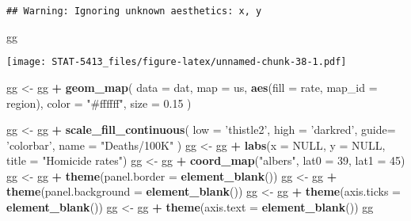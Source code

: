 \documentclass[]{book}
\newenvironment{Shaded}{\begin{snugshade}}{\end{snugshade}}
\newcommand{\DataTypeTok}[1]{\textcolor[rgb]{0.13,0.29,0.53}{#1}}
\newcommand{\DecValTok}[1]{\textcolor[rgb]{0.00,0.00,0.81}{#1}}
\newcommand{\FloatTok}[1]{\textcolor[rgb]{0.00,0.00,0.81}{#1}}
\newcommand{\KeywordTok}[1]{\textcolor[rgb]{0.13,0.29,0.53}{\textbf{#1}}}
\newcommand{\NormalTok}[1]{#1}
\newcommand{\OperatorTok}[1]{\textcolor[rgb]{0.81,0.36,0.00}{\textbf{#1}}}
\newcommand{\OtherTok}[1]{\textcolor[rgb]{0.56,0.35,0.01}{#1}}
\newcommand{\StringTok}[1]{\textcolor[rgb]{0.31,0.60,0.02}{#1}}
\begin{document}
\begin{verbatim}
## Warning: Ignoring unknown aesthetics: x, y
\end{verbatim}

\begin{Shaded}
\begin{Highlighting}[]
\NormalTok{gg}
\end{Highlighting}
\end{Shaded}

\texttt{[image: STAT-5413\_files/figure-latex/unnamed-chunk-38-1.pdf]}

\begin{Shaded}
\begin{Highlighting}[]
\NormalTok{gg <-}\StringTok{ }\NormalTok{gg }\OperatorTok{+}\StringTok{ }\KeywordTok{geom_map}\NormalTok{(}
    \DataTypeTok{data =}\NormalTok{ dat, }
    \DataTypeTok{map =}\NormalTok{ us,}
    \KeywordTok{aes}\NormalTok{(}\DataTypeTok{fill =}\NormalTok{ rate, }\DataTypeTok{map_id =}\NormalTok{ region),}
    \DataTypeTok{color =} \StringTok{"#ffffff"}\NormalTok{, }\DataTypeTok{size =} \FloatTok{0.15}
\NormalTok{)}

\NormalTok{gg <-}\StringTok{ }\NormalTok{gg }\OperatorTok{+}\StringTok{ }\KeywordTok{scale_fill_continuous}\NormalTok{(}
    \DataTypeTok{low  =} \StringTok{'thistle2'}\NormalTok{, }
    \DataTypeTok{high =} \StringTok{'darkred'}\NormalTok{, }
    \DataTypeTok{guide=} \StringTok{'colorbar'}\NormalTok{,}
    \DataTypeTok{name =} \StringTok{"Deaths/100K"}
\NormalTok{)}
\NormalTok{gg <-}\StringTok{ }\NormalTok{gg }\OperatorTok{+}\StringTok{ }\KeywordTok{labs}\NormalTok{(}\DataTypeTok{x =} \OtherTok{NULL}\NormalTok{, }\DataTypeTok{y =} \OtherTok{NULL}\NormalTok{, }\DataTypeTok{title =} \StringTok{"Homicide rates"}\NormalTok{)}
\NormalTok{gg <-}\StringTok{ }\NormalTok{gg }\OperatorTok{+}\StringTok{ }\KeywordTok{coord_map}\NormalTok{(}\StringTok{"albers"}\NormalTok{, }\DataTypeTok{lat0 =} \DecValTok{39}\NormalTok{, }\DataTypeTok{lat1 =} \DecValTok{45}\NormalTok{) }
\NormalTok{gg <-}\StringTok{ }\NormalTok{gg }\OperatorTok{+}\StringTok{ }\KeywordTok{theme}\NormalTok{(}\DataTypeTok{panel.border =} \KeywordTok{element_blank}\NormalTok{())}
\NormalTok{gg <-}\StringTok{ }\NormalTok{gg }\OperatorTok{+}\StringTok{ }\KeywordTok{theme}\NormalTok{(}\DataTypeTok{panel.background =} \KeywordTok{element_blank}\NormalTok{())}
\NormalTok{gg <-}\StringTok{ }\NormalTok{gg }\OperatorTok{+}\StringTok{ }\KeywordTok{theme}\NormalTok{(}\DataTypeTok{axis.ticks =} \KeywordTok{element_blank}\NormalTok{())}
\NormalTok{gg <-}\StringTok{ }\NormalTok{gg }\OperatorTok{+}\StringTok{ }\KeywordTok{theme}\NormalTok{(}\DataTypeTok{axis.text =} \KeywordTok{element_blank}\NormalTok{())}
\NormalTok{gg}
\end{Highlighting}
\end{Shaded}
\end{document}
